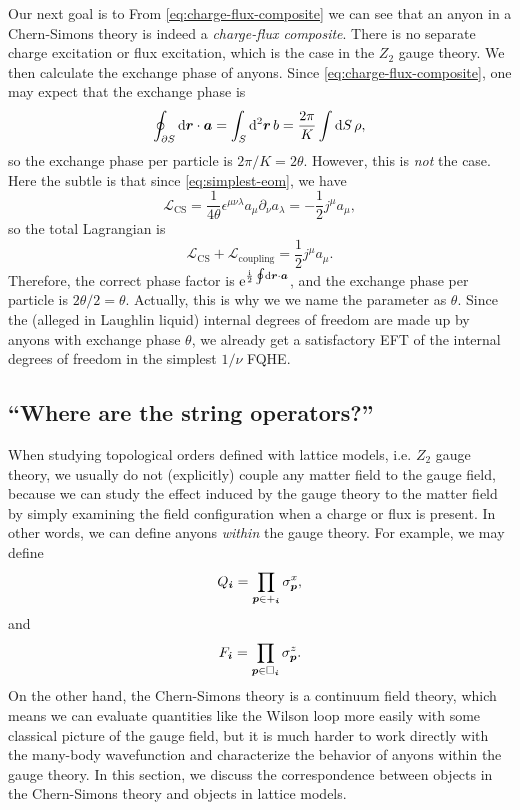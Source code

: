 \documentclass[hyperref, a4paper]{article}
\newcommand*{\ii}{\mathrm{i}}
\newcommand*{\ee}{\mathrm{e}}
\def\mathbb#1{#1}%
\begin{document}
Our next goal is to 
From \eqref{eq:charge-flux-composite} we can see that an anyon in a Chern-Simons theory is indeed a
\emph{charge-flux composite}. There is no separate charge excitation or flux excitation, 
which is the case in the $\mathbb{Z}_2$ gauge theory. We then calculate the exchange phase of anyons.
Since \eqref{eq:charge-flux-composite}, one may expect that the exchange phase is 
\[
    \oint_{\partial S} \dd{\vb*{r}} \cdot \vb*{a} = \int_S \dd[2]{\vb*{r}} b = \frac{2\pi}{K} \int \dd{S} \rho,
\] 
so the exchange phase per particle is $2\pi / K = 2 \theta$. However, this is \emph{not} the case.
Here the subtle is that since \eqref{eq:simplest-eom}, we have 
\[
    \mathcal{L}_\text{CS} = \frac{1}{4 \theta} \epsilon^{\mu \nu \lambda} a_\mu \partial_\nu a_\lambda = - \frac{1}{2} j^\mu a_\mu,
\]
so the total Lagrangian is 
\begin{equation}
    \mathcal{L}_\text{CS} + \mathcal{L}_\text{coupling} = \frac{1}{2} j^\mu a_\mu.
    \label{eq:digonal-coupling-phase}
\end{equation}
Therefore, the correct phase factor is $\ee^{\frac{\ii}{2} \oint \dd{\vb*{r}} \cdot \vb*{a}}$,
and the exchange phase per particle is $2 \theta / 2 = \theta$. Actually, this is why we we name the parameter as $\theta$. 
Since the (alleged in Laughlin liquid) internal degrees of freedom are made up by anyons with exchange phase $\theta$,
we already get a satisfactory EFT of the internal degrees of freedom in the simplest $1/ \nu$ FQHE.

\subsection{``Where are the string operators?''}

When studying topological orders defined with lattice models, i.e. $\mathbb{Z}_2$ gauge theory, we usually 
do not (explicitly) couple any matter field to the gauge field, because we can study the effect induced by 
the gauge theory to the matter field by simply examining the field configuration when a charge or flux is 
present. In other words, we can define anyons \emph{within} the gauge theory. For example, we may define 
\begin{equation}
    Q_{\vb*{i}} = \prod_{\vb*{p} \in +_{\vb*{i}}} \sigma^x_{\vb*{p}},
\end{equation}
and 
\begin{equation}
    F_{\vb*{i}} = \prod_{\vb*{p} \in \Box_{\vb*{i}}} \sigma^z_{\vb*{p}}.
\end{equation}
On the other hand, the Chern-Simons theory is a continuum field theory, which means we can evaluate quantities like the 
Wilson loop more easily with some classical picture of the gauge field, but it is much harder to 
work directly with the many-body wavefunction and characterize the behavior of anyons within the 
gauge theory. In this section, we discuss the correspondence between objects in the Chern-Simons theory 
and objects in lattice models.
\end{document}
